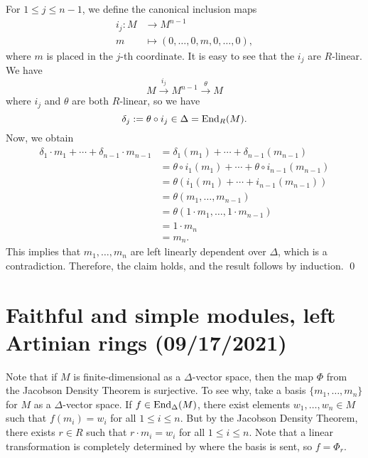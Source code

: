 \begin{enumerate}[(1)]
    For $1 \leq j \leq n-1$, we define the canonical inclusion maps 
    \begin{align*}
        i_j : M &\to M^{n-1} \\
        m &\mapsto (0, \dots, 0, m, 0, \dots, 0),
    \end{align*}
    where $m$ is placed in the $j$-th coordinate. It is easy to see that the $i_j$ are $R$-linear. 
    We have 
    \[ M \xrightarrow{i_j} M^{n-1} \xrightarrow{\theta} M \]
    where $i_j$ and $\theta$ are both $R$-linear, so we have 
    \[ \delta_j := \theta \circ i_j \in \Delta = \operatorname{End}_R(M). \]
    Now, we obtain 
    \begin{align*}
        \delta_1 \cdot m_1 + \cdots + \delta_{n-1} \cdot m_{n-1} 
        &= \delta_1(m_1) + \cdots + \delta_{n-1}(m_{n-1}) \\
        &= \theta \circ i_1(m_1) + \cdots + \theta \circ i_{n-1}(m_{n-1}) \\
        &= \theta(i_1(m_1) + \cdots + i_{n-1}(m_{n-1})) \\
        &= \theta(m_1, \dots, m_{n-1}) \\
        &= \theta(1 \cdot m_1, \dots, 1 \cdot m_{n-1}) \\
        &= 1 \cdot m_n \\
        &= m_n.
    \end{align*}
    This implies that $m_1, \dots, m_n$ are left linearly dependent over $\Delta$, which is a contradiction.
    Therefore, the claim holds, 
    and the result follows by induction. \qed
    
\end{enumerate}

\section{Faithful and simple modules, left Artinian rings (09/17/2021)}

Note that if $M$ is finite-dimensional as a $\Delta$-vector space, then the map $\Phi$ from the 
Jacobson Density Theorem is surjective. To see why, take a basis $\{m_1, \dots, m_n\}$ for $M$ as a 
$\Delta$-vector space. If $f \in \operatorname{End}_\Delta(M)$, there exist elements $w_1, \dots, w_n \in M$ 
such that $f(m_i) = w_i$ for all $1 \leq i \leq n$. But by the Jacobson Density Theorem, there
exists $r \in R$ such that $r \cdot m_i = w_i$ for all $1 \leq i \leq n$. 
Note that a linear transformation is completely 
determined by where the basis is sent, so $f = \Phi_r$. 

